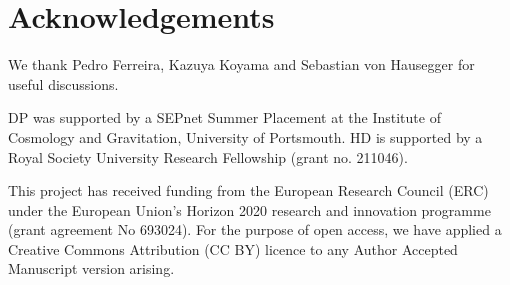 \documentclass[fleqn,usenatbib,nofootinbib]{mnras}
\begin{document}
\section*{Acknowledgements}

We thank Pedro Ferreira, Kazuya Koyama and Sebastian von Hausegger for useful discussions.

DP was supported by a SEPnet Summer Placement at the Institute of Cosmology and Gravitation, University of Portsmouth. HD is supported by a Royal Society University Research Fellowship (grant no. 211046).

This project has received funding from the European Research Council (ERC) under the European Union's Horizon 2020 research and innovation programme (grant agreement No 693024). For the purpose of open access, we have applied a Creative Commons Attribution (CC BY) licence to any Author Accepted Manuscript version arising.





\label{lastpage}
\end{document}
